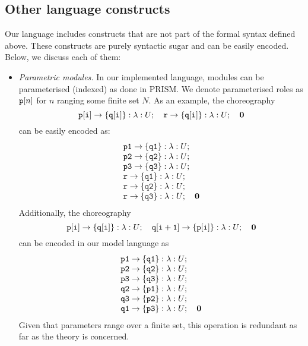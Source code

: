 \subsection{Other language constructs}
%
Our language includes constructs that are not part of the formal syntax defined above. 
These constructs are purely syntactic sugar and can be easily encoded. 
Below, we discuss each of them:
% 
\begin{itemize}

\item {\em Parametric modules.} In our implemented language, modules
  can be parameterised (indexed) as done in PRISM. We denote
  parameterised roles as $\mathtt{p}[n]$ for $n$ ranging some finite set
  $N$.
  As an example, the choreography
  \[\mathtt{p[i]}\rightarrow \{\mathtt{q[i]}\}:\lambda:U;\quad 
    \mathtt{r}\rightarrow \{\mathtt{q[i]}\}:\lambda:U;\quad \mathbf{0}
  \]
  can be easily encoded as:
  \[
    \begin{array}{llll}
      \mathtt{p1}\rightarrow \{\mathtt{q1}\}:\lambda:U;\quad \\
      \mathtt{p2}\rightarrow \{\mathtt{q2}\}:\lambda:U;\quad \\
      \mathtt{p3}\rightarrow \{\mathtt{q3}\}:\lambda:U;\quad \\
      \mathtt{r}\rightarrow \{\mathtt{q1}\}:\lambda:U;\quad \\
      \mathtt{r}\rightarrow \{\mathtt{q2}\}:\lambda:U;\quad \\
      \mathtt{r}\rightarrow \{\mathtt{q3}\}:\lambda:U;\quad \mathbf{0}
    \end{array}
  \]
  Additionally, the choreography
  \[\mathtt{p[i]}\rightarrow \{\mathtt{q[i]}\}:\lambda:U;\quad 
    \mathtt{q[i+1]}\rightarrow \{\mathtt{p[i]}\}:\lambda:U;\quad \mathbf{0}
  \]
  can be encoded in our model language as
  \[
    \begin{array}{llll}
      \mathtt{p1}\rightarrow \{\mathtt{q1}\}:\lambda:U;\quad \\
      \mathtt{p2}\rightarrow \{\mathtt{q2}\}:\lambda:U;\quad \\
      \mathtt{p3}\rightarrow \{\mathtt{q3}\}:\lambda:U;\quad \\
      \mathtt{q2}\rightarrow \{\mathtt{p1}\}:\lambda:U;\quad \\
      \mathtt{q3}\rightarrow \{\mathtt{p2}\}:\lambda:U;\quad \\
      \mathtt{q1}\rightarrow \{\mathtt{p3}\}:\lambda:U;\quad  \mathbf{0}
    \end{array}
  \]
  Given that parameters range over a finite set, this operation is
  redundant as far as the theory is concerned.


\end{itemize}
